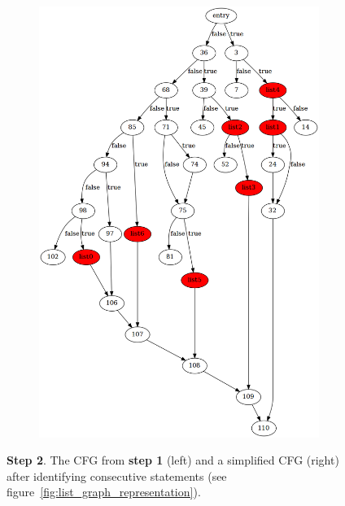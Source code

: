 \begin{figure}[htbp]
\begin{subfigure}[ht]{0.45\textwidth}
		\includegraphics[width=\textwidth]{inc/appendices/control_flow_analysis_example/step2_after.png}
	\end{subfigure}
	\caption{\textbf{Step 2}. The CFG from \textbf{step 1} (left) and a simplified CFG (right) after identifying consecutive statements (see figure~\ref{fig:list_graph_representation}).}
	\label{fig:step_2}
\end{figure}


